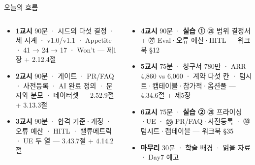 \begin{frame}[shrink=6]{오늘의 흐름}
\begin{columns}[T]
\begin{column}{0.46\textwidth}
\begin{itemize}
\item \textbf{1교시} 90분 · 시드의 다섯 결정 · 세 시계 · v1.0/v1.1 · Appetite · 41 → 24 → 17 · Won't — 제1장 + 2.1\til{}2.4절
\item \textbf{2교시} 90분 · 게이트 · PR/FAQ · 사전등록 · AI 완료 정의 · 분자와 분모 · 데이터셋 — 2.5\til{}2.9절 + 3.1\til{}3.3절
\item \textbf{3교시} 90분 · 합격 기준·개정 · 오류 예산 · HITL · 밸류메트릭 · UE 두 열 — 3.4\til{}3.7절 + 4.1\til{}4.2절
\end{itemize}
\end{column}
\begin{column}{0.52\textwidth}
\begin{itemize}
\item \textbf{4교시} 90분 · \textbf{실습 ①} ㉖ 범위 결정서 + ㉗ Eval·오류 예산·HITL — 워크북 §1\til{}2
\item \textbf{5교시} 75분 · 청구서 780만 · ARR 4,860 vs 6,060 · 계약 다섯 칸 · 텀시트·캡테이블·참가적·옵션풀 — 4.3\til{}4.6절 + 제5장
\item \textbf{6교시} 75분 · \textbf{실습 ②} ㉘ 프라이싱·UE · ㉙ PR/FAQ·사전등록 · ㉚ 텀시트·캡테이블 — 워크북 §3\til{}5
\item \textbf{마무리} 30분 · 학술 배경 · 읽을 자료 · Day7 예고
\end{itemize}
\end{column}
\end{columns}
\end{frame}

